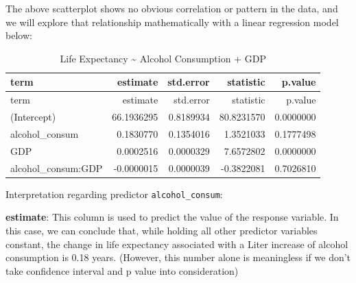 \documentclass[
]{article}
\newenvironment{Shaded}{\begin{snugshade}}{\end{snugshade}}
\newcommand{\DataTypeTok}[1]{\textcolor[rgb]{0.00,0.34,0.68}{#1}}
\newcommand{\KeywordTok}[1]{\textcolor[rgb]{0.12,0.11,0.11}{\textbf{#1}}}
\newcommand{\NormalTok}[1]{\textcolor[rgb]{0.12,0.11,0.11}{#1}}
\newcommand{\OperatorTok}[1]{\textcolor[rgb]{0.12,0.11,0.11}{#1}}
\newcommand{\StringTok}[1]{\textcolor[rgb]{0.75,0.01,0.01}{#1}}
\begin{document}
The above scatterplot shows no obvious correlation or pattern in the
data, and we will explore that relationship mathematically with a linear
regression model below:

\begin{Shaded}
\end{Shaded}

\begin{longtable}[]{@{}lrrrr@{}}
\caption{Life Expectancy \textasciitilde{} Alcohol Consumption +
GDP}\tabularnewline
\toprule
term & estimate & std.error & statistic & p.value\tabularnewline
\midrule
\endfirsthead
\toprule
term & estimate & std.error & statistic & p.value\tabularnewline
\midrule
\endhead
(Intercept) & 66.1936295 & 0.8189934 & 80.8231570 &
0.0000000\tabularnewline
alcohol\_consum & 0.1830770 & 0.1354016 & 1.3521033 &
0.1777498\tabularnewline
GDP & 0.0002516 & 0.0000329 & 7.6572802 & 0.0000000\tabularnewline
alcohol\_consum:GDP & -0.0000015 & 0.0000039 & -0.3822081 &
0.7026810\tabularnewline
\bottomrule
\end{longtable}

Interpretation regarding predictor \texttt{alcohol\_consum}:

\textbf{estimate}: This column is used to predict the value of the
response variable. In this case, we can conclude that, while holding all
other predictor variables constant, the change in life expectancy
associated with a Liter increase of alcohol consumption is 0.18 years.
(However, this number alone is meaningless if we don't take confidence
interval and p value into consideration)
\end{document}
